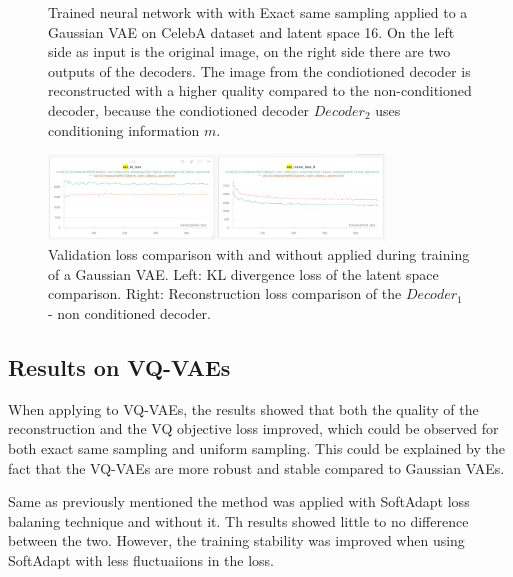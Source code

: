 \begin{figure}[H]
    \centering
    
    \caption[Trained neural network with  applied to a Gaussian VAE.]
    { 
        Trained neural network with  with Exact same sampling applied to a Gaussian VAE on CelebA dataset and latent space 16. 
        On the left side as input is the original image, on the right side there are two outputs of the decoders. 
        The image from the condiotioned decoder is reconstructed with a higher quality compared to the non-conditioned decoder, because the condiotioned decoder $Decoder_2$ uses conditioning information $m$.
    }
    \label{fig:res_val}
\end{figure}


\begin{figure}[H]
    \centering
    \includegraphics[width=0.8\textwidth]{figures/results/KL_and_RECON.png}
    \caption[Validation loss comparison during training of a Gaussian VAE.]
    {
        Validation loss comparison with and without  applied during training of a Gaussian VAE.
        Left: KL divergence loss of the latent space comparison. Right: Reconstruction loss comparison of the $Decoder_1$ - non conditioned decoder.
    }
    \label{fig:results_method1_gaussian_vae}
\end{figure}

\subsection{Results on VQ-VAEs}

When applying  to VQ-VAEs, the results showed that both the quality of the reconstruction and the VQ objective loss improved, which could be observed for both exact same sampling and uniform sampling. This could be explained by the fact that the VQ-VAEs are more robust and stable compared to Gaussian VAEs.

Same as previously mentioned the method was applied with SoftAdapt loss balaning technique and without it. Th results showed little to no difference between the two. However, the training stability was improved when using SoftAdapt with less fluctuaiions in the loss.



